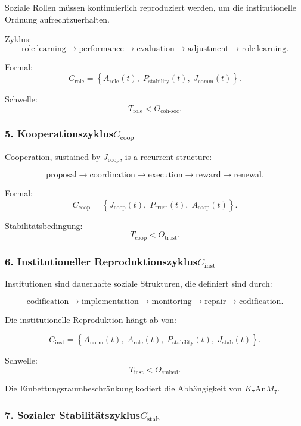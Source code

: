 Soziale Rollen müssen kontinuierlich reproduziert werden, um die institutionelle Ordnung aufrechtzuerhalten.

Zyklus:
\[
  \mathrm{role\ learning}
  \to
  \mathrm{performance}
  \to
  \mathrm{evaluation}
  \to
  \mathrm{adjustment}
  \to
  \mathrm{role\ learning}.
\]

Formal:
\[
  C_{\mathrm{role}}
  =
  \left\{
     A_{\mathrm{role}}(t),\;
     P_{\mathrm{stability}}(t),\;
     J_{\mathrm{comm}}(t)
  \right\}.
\]

Schwelle:
\[
  T_{\mathrm{role}} < \Theta_{\mathrm{coh\text{-}soc}}.
\]

\subsubsection{5. Kooperationszyklus$C_{\mathrm{coop}}$}

Cooperation, sustained by $J_{\mathrm{coop}}$, is a recurrent structure:

\[
 \mathrm{proposal}
 \to
 \mathrm{coordination}
 \to
 \mathrm{execution}
 \to
 \mathrm{reward}
 \to
 \mathrm{renewal}.
\]

Formal:
\[
 C_{\mathrm{coop}}=
 \left\{
   J_{\mathrm{coop}}(t),\;
   P_{\mathrm{trust}}(t),\;
   A_{\mathrm{coop}}(t)
 \right\}.
\]

Stabilitätsbedingung:
\[
 T_{\mathrm{coop}} < \Theta_{\mathrm{trust}}.
\]

\subsubsection{6. Institutioneller Reproduktionszyklus$C_{\mathrm{inst}}$}

Institutionen sind dauerhafte soziale Strukturen, die definiert sind durch:

\[
  \mathrm{codification}
  \to
  \mathrm{implementation}
  \to
  \mathrm{monitoring}
  \to
  \mathrm{repair}
  \to
  \mathrm{codification}.
\]

Die institutionelle Reproduktion hängt ab von:

\[
 C_{\mathrm{inst}}
 =
 \left\{
   A_{\mathrm{norm}}(t),\;
   A_{\mathrm{role}}(t),\;
   P_{\mathrm{stability}}(t),\;
   J_{\mathrm{stab}}(t)
 \right\}.
\]

Schwelle:
\[
 T_{\mathrm{inst}} < \Theta_{\mathrm{embed}}.
\]

Die Einbettungsraumbeschränkung kodiert die Abhängigkeit von
$K_7$An$M_7$.

\subsubsection{7. Sozialer Stabilitätszyklus$C_{\mathrm{stab}}$}

